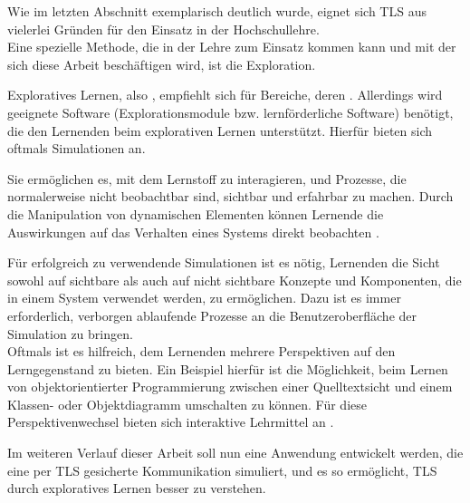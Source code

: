 Wie im letzten Abschnitt exemplarisch deutlich wurde, eignet sich TLS aus vielerlei Gründen für den Einsatz in der Hochschullehre.\\
Eine spezielle Methode, die in der Lehre zum Einsatz kommen kann und mit der sich diese Arbeit beschäftigen wird, ist die Exploration.

Exploratives Lernen, also  \cite{schubert11}, empfiehlt sich für Bereiche, deren  \cite{schubert11}. 
Allerdings wird geeignete Software (Explorationsmodule bzw. lernförderliche Software) benötigt, die den Lernenden beim explorativen Lernen unterstützt. Hierfür bieten sich oftmals Simulationen an. 

\begin{quote}
 \cite{niegemann08}
\end{quote}

Sie ermöglichen es, mit dem Lernstoff zu interagieren, und Prozesse, die normalerweise nicht beobachtbar sind, sichtbar und erfahrbar zu machen. Durch die Manipulation von dynamischen Elementen können Lernende die Auswirkungen auf das Verhalten eines Systems direkt beobachten \cite{niegemann08}.

Für erfolgreich zu verwendende Simulationen ist es nötig, Lernenden die Sicht sowohl auf sichtbare als auch auf  nicht sichtbare Konzepte und Komponenten, die in einem System verwendet werden, zu ermöglichen. Dazu ist es immer erforderlich, verborgen ablaufende Prozesse an die Benutzeroberfläche der Simulation zu bringen. \\
Oftmals ist es hilfreich, dem Lernenden mehrere Perspektiven auf den Lerngegenstand zu bieten. Ein Beispiel hierfür ist die Möglichkeit, beim Lernen von objektorientierter Programmierung zwischen einer Quelltextsicht und einem Klassen- oder Objektdiagramm umschalten zu können. Für diese Perspektivenwechsel bieten sich interaktive Lehrmittel an \cite{schubert11}.

Im weiteren Verlauf dieser Arbeit soll nun eine Anwendung entwickelt werden, die eine per TLS gesicherte Kommunikation simuliert, und es so ermöglicht, TLS durch exploratives Lernen besser zu verstehen.
